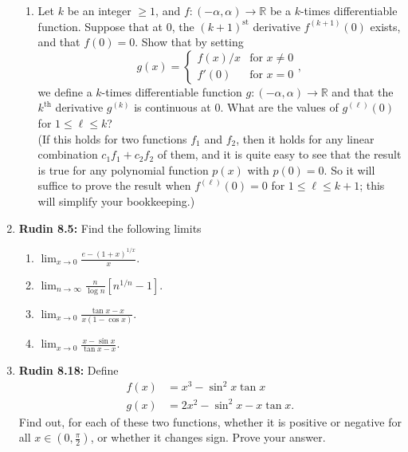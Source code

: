 \documentclass[11pt]{article}
\newcommand{\R}{\mathbb{R}}
\begin{document}
\begin{enumerate}
\begin{enumerate}
        \item Let \(k\) be an integer \(\geq 1\), and \(f \colon (-\alpha, \alpha) \to \R\) be a \(k\)-times 
          differentiable function.  Suppose that at \(0\), the \((k+1)^{\text{st}}\) derivative \(f^{(k+1)}(0)\) 
          exists, and that \(f(0) = 0\).  Show that by setting
          \[
            g(x) = \begin{cases}
              f(x)/x & \text{for } x \neq 0 \\
              f'(0) & \text{for } x = 0
            \end{cases},
          \]
          we define a \(k\)-times differentiable function \(g \colon (-\alpha, \alpha) \to \R\) and that the 
          \(k^{\text{th}}\) derivative \(g^{(k)}\) is continuous at \(0\).  What are the values of \(g^{(\ell)}(0)\) 
          for \(1 \leq \ell \leq k\)? \\
          (If this holds for two functions \(f_1\) and \(f_2\), then it holds for any linear combination 
          \(c_1f_1 + c_2f_2\) of them, and it is quite easy to see that the result is true for any polynomial 
          function \(p(x)\) with \(p(0) = 0\).  So it will suffice to prove the result when \(f^{(\ell)}(0) = 0\) 
          for \(1 \leq \ell \leq k+1\); this will simplify your bookkeeping.)
      \end{enumerate}
      \newpage

    \item \textbf{Rudin 8.5:} Find the following limits
      \begin{enumerate}
        \item \(\displaystyle\lim_{x \to 0} \frac{e - (1+x)^{1/x}}{x}\).
        \item \(\displaystyle\lim_{n \to \infty} \frac{n}{\log n}[n^{1/n} - 1]\).
        \item \(\displaystyle\lim_{x \to 0} \frac{\tan x - x}{x(1 - \cos x)}\).
        \item \(\displaystyle\lim_{x \to 0} \frac{x - \sin x}{\tan x - x}\).
      \end{enumerate}
      \newpage

    \item \textbf{Rudin 8.18:} Define 
      \begin{align*}
        f(x) &= x^3 - \sin^2 x \tan x \\
        g(x) &= 2x^2 - \sin^2 x - x\tan x.
      \end{align*}
      Find out, for each of these two functions, whether it is positive or negative for all 
      \(x \in \left(0, \frac{\pi}{2}\right)\), or whether it changes sign.  Prove your answer.
  \end{enumerate}
\end{document}

